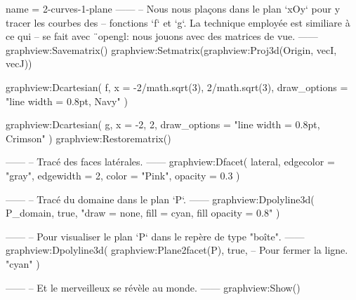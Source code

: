 \documentclass{standalone}
\begin{document}
\begin{luadraw}{name = 2-curves-1-plane}
------
-- Nous nous plaçons dans le plan `xOy` pour y tracer les courbes des
-- fonctions  `f` et `g`. La technique employée est similiare à ce qui
-- se fait avec ¨opengl: nous jouons avec des matrices de vue.
------
graphview:Savematrix()
  graphview:Setmatrix(graphview:Proj3d({Origin, vecI, vecJ}))

  graphview:Dcartesian(
    f,
    {
      x = {-2/math.sqrt(3), 2/math.sqrt(3)},
      draw_options = "line width = 0.8pt, Navy"
    })

  graphview:Dcartesian(
    g,
    {
      x = {-2, 2},
      draw_options = "line width = 0.8pt, Crimson"
    })
graphview:Restorematrix()

------
-- Tracé des faces latérales.
------
graphview:Dfacet(
  lateral,
  {
    edgecolor = "gray",
    edgewidth = 2,
    color     = "Pink",
    opacity   = 0.3
  })

------
-- Tracé du domaine dans le plan `P`.
------
graphview:Dpolyline3d(
  P_domain,
  true,
  "draw = none, fill = cyan, fill opacity = 0.8"
)

------
-- Pour visualiser le plan `P` dans le repère de type "boîte".
------
graphview:Dpolyline3d(
  graphview:Plane2facet(P),
  true,   -- Pour fermer la ligne.
  "cyan"
)

------
-- Et le merveilleux se révèle au monde.
------
graphview:Show()
\end{luadraw}
\end{document}
